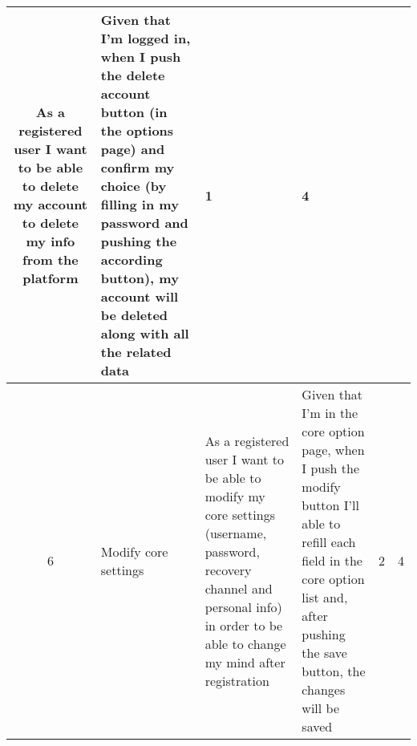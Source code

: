 \begin{tabular}{|c|m{1.5cm}|m{4cm}|m{4cm}|c|c|}
	As a registered user I want to be able to delete my account to delete my info from the platform & 
	Given that I'm logged in, when I push the delete account button (in the options page) and confirm my choice (by filling in my password and pushing the according button), my account will be deleted along with all the related data &
	1 & 4 \\
	\hline
	6 & Modify core settings & 
	As a registered user I want to be able to modify my core settings (username, password, recovery channel and personal info) in order to be able to change my mind after registration & 
	Given that I'm in the core option page, when I push the modify button I'll able to refill each field in the core option list and, after pushing the save button, the changes will be saved &
	2 & 4 \\
	\hline
\end{tabular}    
